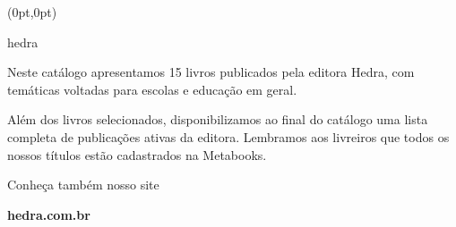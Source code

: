 \begin{textblock*}{5.625in}(0pt,0pt)%
\vspace*{-3cm}
\end{textblock*}

\pagebreak

\pagestyle{indice}

\hfill
\begin{center}
\newfontfamily{}
{\fontsize{160}{50}\selectfont \timesnewroman hedra}
\end{center}
\vspace{1cm}












\vspace{1cm}

\hspace*{-.5cm}\parbox{180pt}{\raggedright
Neste catálogo apresentamos 15
livros publicados pela editora Hedra, com temáticas voltadas 
para escolas e educação em geral. 

\vspace{1em}

Além dos livros selecionados, disponibilizamos ao final 
do catálogo uma lista completa de publicações ativas da editora. Lembramos aos 
livreiros que todos os nossos títulos
estão cadastrados na Metabooks.

\vspace{1em}

Conheça também nosso site

\textbf{hedra.com.br}
} %

